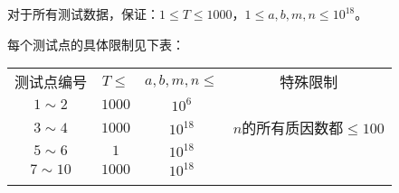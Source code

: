 对于所有测试数据，保证：$1\leq T\leq 1000$，$1\leq a,b,m,n\leq 10^{18}$。

每个测试点的具体限制见下表：
\begin{center}
  \begin{tabular}{c|c|c|c}
    \Xhline{5\arrayrulewidth}
    测试点编号      & $T\le $ & $a,b,m,n\leq$ & 特殊限制                \\
    \Xhline{3\arrayrulewidth}
    $1\sim2$   & $1000$  & $10^6$        &                     \\
    \hline
    $3\sim4$   & $1000$  & $10^{18}$     & $n$的所有质因数都$\le 100$ \\
    \hline
    $5\sim 6$  & $1$     & $10^{18}$     &                     \\
    \hline
    $7\sim 10$ & $1000$  & $10^{18}$     &                     \\
    \Xhline{5\arrayrulewidth}
  \end{tabular}
\end{center}
